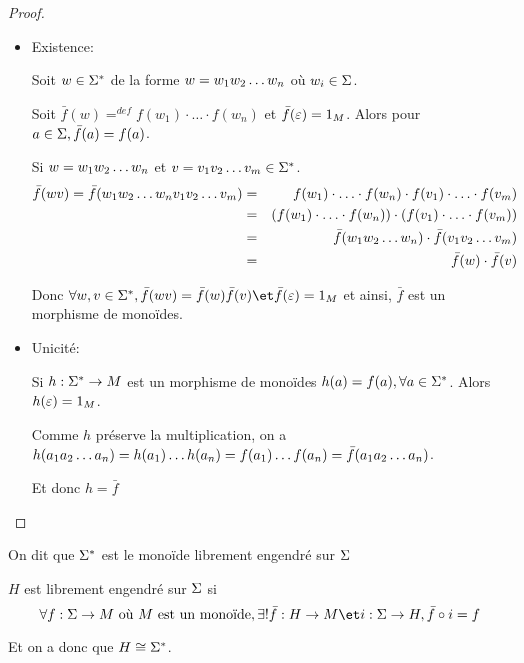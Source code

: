 \begin{proof}
	\begin{itemize}
		\item Existence:

		      Soit $w\in \Sigma^{*}$ de la forme $w = w_1 w_2 \ldots w_{n}$ où $w_i \in \Sigma$.

		      Soit $\bar f (w) =^{def} f(w_1) \cdot \ldots \cdot f(w_n)$ et $\bar f (\varepsilon) = 1_M$. Alors pour $a\in \Sigma, \bar f (a) = f (a)$.

		      Si $w = w_1 w_2 \ldots w_{n}$ et $v = v_1 v_2 \ldots v_{m} \in \Sigma^{*}$.
		      \begin{eqnarray*}
			      \bar f(wv) = \bar f(w_1 w_2 \ldots w_{n} v_1 v_2 \ldots v_{m}) &=& f(w_1) \cdot \ldots \cdot f(w_n) \cdot f(v_1) \cdot \ldots \cdot f(v_m) \\
			      &=& \left( f(w_1) \cdot \ldots \cdot f(w_n)\right)\cdot\left(f(v_1) \cdot \ldots \cdot f(v_m) \right)\\
			      &=& \bar f(w_1 w_2 \ldots w_{n}) \cdot \bar f (v_1 v_2 \ldots v_{m}) \\
			      &=& \bar f(w) \cdot \bar f (v)
		      \end{eqnarray*}

		      Donc $\forall w, v \in \mots, \bar f (wv) = \bar f (w)\bar f(v) \et \bar f (\motvide) = 1_M$ et ainsi, $\bar f$ est un morphisme de monoïdes.


		\item Unicité:

		      Si $h : \Sigma^{*} \to M$ est un morphisme de monoïdes \tq $h(a) = f(a), \forall a \in \Sigma^{*}$. Alors $h(\varepsilon) = 1_M$.

		      Comme $h$ préserve la multiplication, on a
		      $h (a_1 a_2 \ldots a_{n}) = h(a_1) \ldots h(a_n) = f(a_1) \ldots f(a_n) = \bar f (a_1 a_2 \ldots a_{n})$.

		      Et donc $h = \bar f$
	\end{itemize}
\end{proof}

On dit que $\Sigma^{*}$ est le monoïde librement engendré sur $\Sigma$

\begin{definition}
	$H$ est librement engendré sur $\Sigma$ si
	$$\forall f : \alphabet \to M \text{ où } M  \text { est un monoïde}, \exists ! \bar f : H \to M \et i : \alphabet \to H, \bar f \circ i   = f $$


    Et on a donc que $ H \cong \Sigma^{*}$.
\end{definition}


